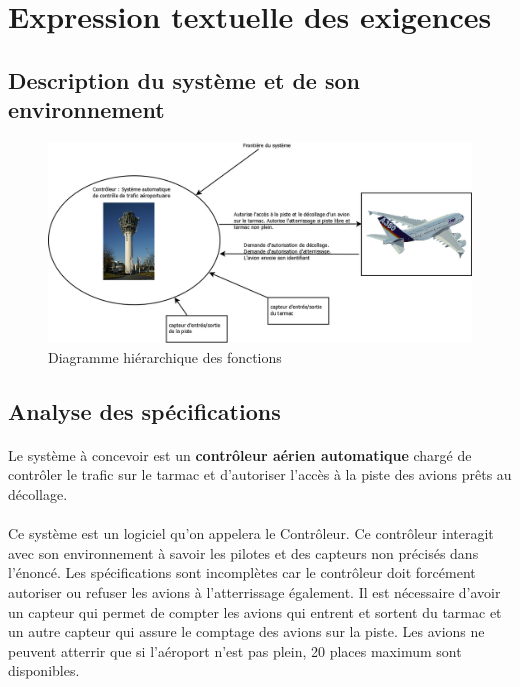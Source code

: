 \section{Expression textuelle des exigences}



\subsection{Description du système et de son environnement}
\begin{figure}[H]
	\begin{center}	
		\includegraphics[scale=0.3]{images/ctx}
		\caption{Diagramme hiérarchique des fonctions}
		\label{ctx}
	\end{center}
\end{figure}


\subsection{Analyse des spécifications}

\paragraph{}

Le système à concevoir est un \textbf{contrôleur aérien automatique} chargé de contrôler le trafic sur le tarmac et d'autoriser l'accès à la piste des avions prêts au décollage. 
\paragraph{}
Ce système est un logiciel qu'on appelera le Contrôleur. Ce contrôleur interagit avec son environnement à savoir les pilotes et des capteurs non précisés dans l'énoncé. Les spécifications sont incomplètes car le contrôleur doit forcément autoriser ou refuser les avions à l'atterrissage également. Il est nécessaire d'avoir un capteur qui permet de compter les avions qui entrent et sortent du tarmac et un autre capteur qui assure le comptage des avions sur la piste. Les avions ne peuvent atterrir que si l'aéroport n'est pas plein, 20 places maximum sont disponibles. 
